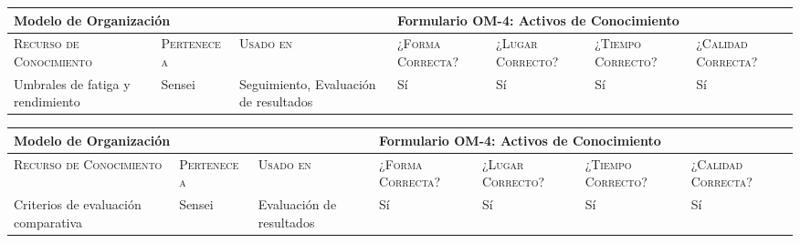 \documentclass[12pt,a4paper,twoside,spanish]{article}      %
\begin{document}
            \begin{table}[H]
                \scriptsize
                \begin{tabularx}{\textwidth}{|p{1.3cm}|p{1.3cm}|p{1.3cm}|X|X|X|X|} \hline   
                    \multicolumn{3}{|l}{\textbf{Modelo de Organización}} & 
                    \multicolumn{4}{|l|}{\textbf{Formulario OM-4: Activos de Conocimiento}} \\ \hline\hline
                    
                    \textsc{Recurso de Conocimiento} & \textsc{Pertenece a} &  \textsc{Usado en} &  \textsc{¿Forma Correcta?} & \textsc{¿Lugar Correcto?} & \textsc{¿Tiempo Correcto?} & \textsc{¿Calidad Correcta?} \\ \hline
                    
                    Umbrales de fatiga y rendimiento & Sensei & Seguimiento, Evaluación de resultados & Sí & Sí & Sí & Sí \\ \hline           
                \end{tabularx}
                \label{tab.OM4-umbrales}
            \end{table}



            \begin{table}[H]
                \scriptsize
                \begin{tabularx}{\textwidth}{|p{1.3cm}|p{1.3cm}|p{1.3cm}|X|X|X|X|} \hline           
                    \multicolumn{3}{|l}{\textbf{Modelo de Organización}} & 
                    \multicolumn{4}{|l|}{\textbf{Formulario OM-4: Activos de Conocimiento}} \\ \hline\hline
                    
                    \textsc{Recurso de Conocimiento} & \textsc{Pertenece a} &  \textsc{Usado en} &  \textsc{¿Forma Correcta?} & \textsc{¿Lugar Correcto?} & \textsc{¿Tiempo Correcto?} & \textsc{¿Calidad Correcta?} \\ \hline
                    
                    Criterios de evaluación comparativa & Sensei & Evaluación de resultados & Sí & Sí & Sí & Sí \\ \hline                
                \end{tabularx}
                \label{tab.OM4-criterios-eval}
            \end{table}

            \pagebreak
            
\end{document}
